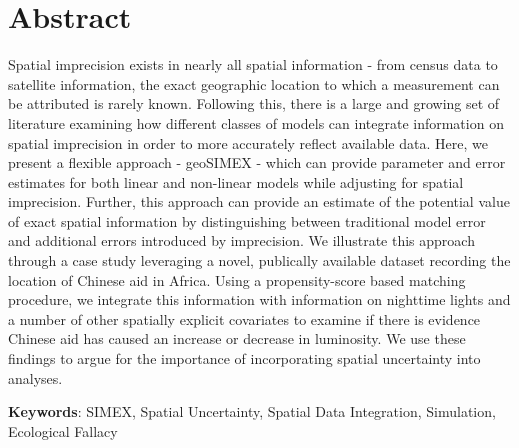 \section{Abstract}
Spatial imprecision exists in nearly all spatial information - from census data to satellite information, the exact geographic location to which a measurement can be attributed is rarely known.
Following this, there is a large and growing set of literature examining how different classes of models can integrate information on spatial imprecision in order to more accurately reflect available data.
Here, we present a flexible approach - geoSIMEX - which can provide parameter and error estimates for both linear and non-linear models while adjusting for spatial imprecision.
Further, this approach can provide an estimate of the potential value of exact spatial information by distinguishing between traditional model error and additional errors introduced by imprecision.
We illustrate this approach through a case study leveraging a novel, publically available dataset recording the location of Chinese aid in Africa.
Using a propensity-score based matching procedure, we integrate this information with information on nighttime lights and a number of other spatially explicit covariates to examine if there is evidence Chinese aid has caused an increase or decrease in luminosity.
We use these findings to argue for the importance of incorporating spatial uncertainty into analyses.

\textbf{Keywords}: SIMEX, Spatial Uncertainty, Spatial Data Integration, Simulation, Ecological Fallacy\\
